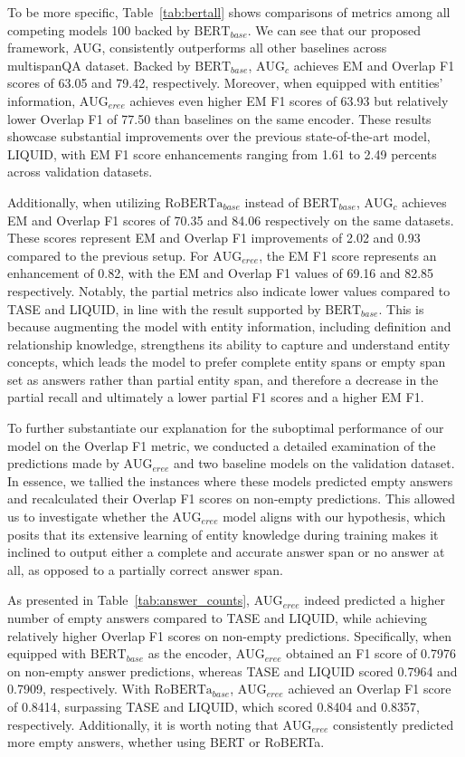 \documentclass[a4paper,fleqn,twocolumn]{cas-dc}
\newcommand{\1}[1]{\mathds{1}\left[#1\right]}
\begin{document}
	To be more specific, Table~\ref{tab:bertall} shows comparisons of metrics among all competing models 100 backed by $\text{BERT}_{base}$. We can see that our proposed framework, AUG, consistently outperforms all other baselines across multispanQA dataset. Backed by $\text{BERT}_{base}$, $\text{AUG}_{c}$ achieves EM and Overlap F1 scores of 63.05 and 79.42, respectively. Moreover, when equipped with entities’ information,  $\text{AUG}_{eree}$ achieves even higher EM F1 scores of 63.93 but relatively lower Overlap F1 of 77.50 than baselines on the same encoder. These results showcase substantial improvements over the previous state-of-the-art model, LIQUID, with EM F1 score enhancements ranging from 1.61 to 2.49 percents across validation datasets. 
	
	Additionally, when utilizing $\text{RoBERTa}_{base}$ instead of $\text{BERT}_{base}$, $\text{AUG}_{c}$ achieves EM and Overlap F1 scores of 70.35 and 84.06 respectively on the same datasets. These scores represent EM and Overlap F1 improvements of 2.02 and 0.93 compared to the previous setup. For  $\text{AUG}_{eree}$, the EM F1 score represents an enhancement of 0.82, with the EM and Overlap F1 values of 69.16 and 82.85 respectively. Notably, the partial metrics also indicate lower values compared to TASE and LIQUID, in line with the result supported by $\text{BERT}_{base}$. This is because augmenting the model with entity information, including definition and relationship knowledge, strengthens its ability to capture and understand entity concepts, which leads the model to prefer complete entity spans or empty span set as answers rather than partial entity span, and therefore a decrease in the partial recall and ultimately a lower partial F1 scores and a higher EM F1.
	

	To further substantiate our explanation for the suboptimal performance of our model on the Overlap F1 metric, we conducted a detailed examination of the predictions made by $\text{AUG}_{eree}$ and two baseline models on the validation dataset. In essence, we tallied the instances where these models predicted empty answers and recalculated their Overlap F1 scores on non-empty predictions. This allowed us to investigate whether the $\text{AUG}_{eree}$ model aligns with our hypothesis, which posits that its extensive learning of entity knowledge during training makes it inclined to output either a complete and accurate answer span or no answer at all, as opposed to a partially correct answer span.

	As presented in Table~\ref{tab:answer_counts}, $\text{AUG}_{eree}$ indeed predicted a higher number of empty answers compared to TASE and LIQUID, while achieving relatively higher Overlap F1 scores on non-empty predictions. Specifically, when equipped with $\text{BERT}_{base}$ as the encoder, $\text{AUG}_{eree}$ obtained an F1 score of 0.7976 on non-empty answer predictions, whereas TASE and LIQUID scored 0.7964 and 0.7909, respectively. With $\text{RoBERTa}_{base}$, $\text{AUG}_{eree}$ achieved an Overlap F1 score of 0.8414, surpassing TASE and LIQUID, which scored 0.8404 and 0.8357, respectively. Additionally, it is worth noting that $\text{AUG}_{eree}$ consistently predicted more empty answers, whether using BERT or RoBERTa.
\end{document}
